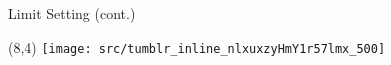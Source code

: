 
\begin{frame}{Limit Setting (cont.)}
    \tableofcontents[hidesubsections,subsubsectionstyle=hide/hide]

        \begin{textblock}{5}(8,4) %
            \texttt{[image: src/tumblr\_inline\_nlxuxzyHmY1r57lmx\_500]}
        \end{textblock}
\end{frame}

